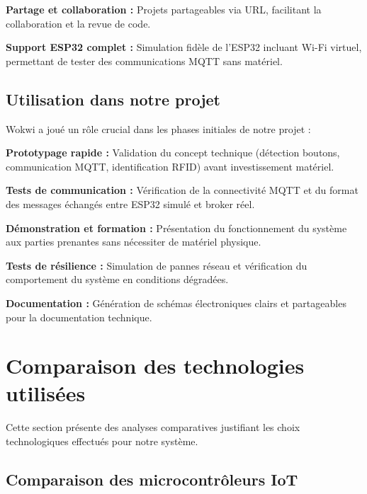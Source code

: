 \textbf{Partage et collaboration :} Projets partageables via URL, facilitant la collaboration et la revue de code.

\textbf{Support ESP32 complet :} Simulation fidèle de l'ESP32 incluant Wi-Fi virtuel, permettant de tester des communications MQTT sans matériel.

\subsection{Utilisation dans notre projet}

Wokwi a joué un rôle crucial dans les phases initiales de notre projet :

\textbf{Prototypage rapide :} Validation du concept technique (détection boutons, communication MQTT, identification RFID) avant investissement matériel.

\textbf{Tests de communication :} Vérification de la connectivité MQTT et du format des messages échangés entre ESP32 simulé et broker réel.


\textbf{Démonstration et formation :} Présentation du fonctionnement du système aux parties prenantes sans nécessiter de matériel physique.

\textbf{Tests de résilience :} Simulation de pannes réseau et vérification du comportement du système en conditions dégradées.

\textbf{Documentation :} Génération de schémas électroniques clairs et partageables pour la documentation technique.


\section{Comparaison des technologies utilisées}

Cette section présente des analyses comparatives justifiant les choix technologiques effectués pour notre système.

\subsection{Comparaison des microcontrôleurs IoT}


